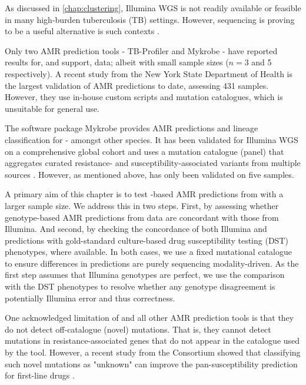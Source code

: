 As discussed in \autoref{chap:clustering}, Illumina WGS is not readily available or feasible in many high-burden tuberculosis (TB) settings. However, \ont{} sequencing is proving to be a useful alternative is such contexts \cite{Inzaule2021,faria2016,quick2016,who-ngs2018}. 

Only two \mtb{} AMR prediction tools - TB-Profiler \cite{phelan2019} and Mykrobe \cite{hunt2019} - have reported results for, and support, \ont{} data; albeit with small sample sizes ($n=3$ and 5 respectively). A recent study from the New York State Department of Health is the largest validation of \ont{} AMR predictions to date, assessing 431 samples. However, they use in-house custom scripts and mutation catalogues, which is unsuitable for general use. 

The software package Mykrobe provides AMR predictions and lineage classification for \mtb{} - amongst other species. It has been validated for Illumina WGS on a comprehensive global cohort and uses a mutation catalogue (panel) that aggregates curated resistance- and susceptibility-associated variants from multiple sources \cite{hunt2019}. However, as mentioned above, \mykrobe{} has only been validated on five \ont{} samples.

A primary aim of this chapter is to test \ont{}-based AMR predictions from \mykrobe{} with a larger sample size. We address this in two steps. First, by assessing whether genotype-based AMR predictions from \ont{} data are concordant with those from Illumina. And second, by checking the concordance of both Illumina and \ont{} predictions with gold-standard culture-based drug susceptibility testing (DST) phenotypes, where available. In both cases, we use a fixed mutational catalogue to ensure differences in predictions are purely sequencing modality-driven. As the first step assumes that Illumina genotypes are perfect, we use the comparison with the DST phenotypes to resolve whether any genotype disagreement is potentially Illumina error and thus \ont{} correctness.

One acknowledged limitation of \mykrobe{} and all other \mtb{} AMR prediction tools is that they do not detect off-catalogue (novel) mutations. That is, they cannot detect mutations in resistance-associated genes that do not appear in the catalogue used by the tool. However, a recent study from the \cryptic{} Consortium showed that classifying such novel mutations as "unknown" can improve the pan-susceptibility prediction for first-line drugs \cite{cryptic2018}. 


